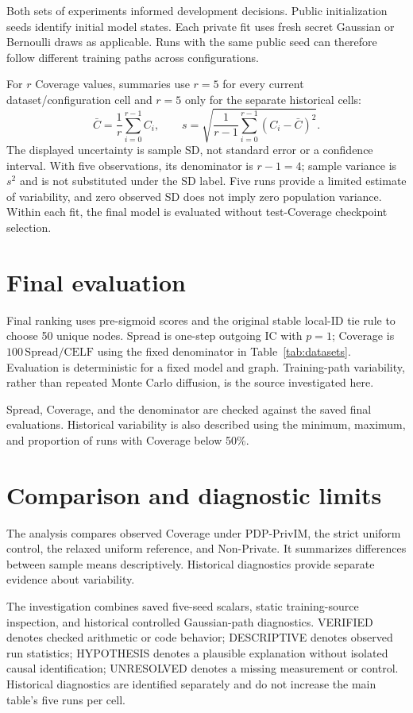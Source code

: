 Both sets of experiments informed development decisions. Public initialization seeds identify initial model states. Each private fit uses fresh secret Gaussian or Bernoulli draws as applicable. Runs with the same public seed can therefore follow different training paths across configurations.

For $r$ Coverage values, summaries use $r=5$ for every current dataset/configuration cell and $r=5$ only for the separate historical cells:
\begin{equation}
 \bar C=\frac{1}{r}\sum_{i=0}^{r-1}C_i,\qquad
 s=\sqrt{\frac{1}{r-1}\sum_{i=0}^{r-1}(C_i-\bar C)^2}.\label{eq:fiveseed}
\end{equation}
The displayed uncertainty is sample SD, not standard error or a confidence interval. With five observations, its denominator is $r-1=4$; sample variance is $s^2$ and is not substituted under the SD label. Five runs provide a limited estimate of variability, and zero observed SD does not imply zero population variance. Within each fit, the final model is evaluated without test-Coverage checkpoint selection.

\section{Final evaluation}
Final ranking uses pre-sigmoid scores and the original stable local-ID tie rule to choose 50 unique nodes. Spread is one-step outgoing IC with $p=1$; Coverage is $100\,\mathrm{Spread}/\mathrm{CELF}$ using the fixed denominator in Table~\ref{tab:datasets}. Evaluation is deterministic for a fixed model and graph. Training-path variability, rather than repeated Monte Carlo diffusion, is the source investigated here.

Spread, Coverage, and the denominator are checked against the saved final evaluations. Historical variability is also described using the minimum, maximum, and proportion of runs with Coverage below 50\%.

\section{Comparison and diagnostic limits}
The analysis compares observed Coverage under PDP-PrivIM, the strict uniform control, the relaxed uniform reference, and Non-Private. It summarizes differences between sample means descriptively. Historical diagnostics provide separate evidence about variability.

The investigation combines saved five-seed scalars, static training-source inspection, and historical controlled Gaussian-path diagnostics. VERIFIED denotes checked arithmetic or code behavior; DESCRIPTIVE denotes observed run statistics; HYPOTHESIS denotes a plausible explanation without isolated causal identification; UNRESOLVED denotes a missing measurement or control. Historical diagnostics are identified separately and do not increase the main table's five runs per cell.
